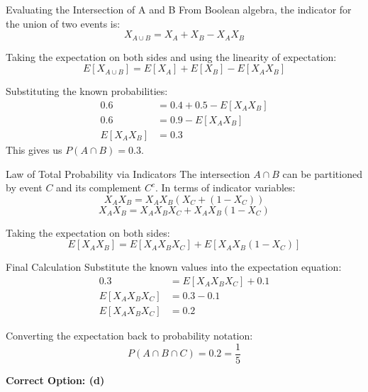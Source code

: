 \documentclass{beamer}
\begin{document}
\begin{frame}{Evaluating the Intersection of A and B}
    From Boolean algebra, the indicator for the union of two events is:
    \begin{equation}
        X_{A \cup B} = X_A + X_B - X_A X_B
    \end{equation}
    
    Taking the expectation on both sides and using the linearity of expectation:
    \begin{equation}
        E[X_{A \cup B}] = E[X_A] + E[X_B] - E[X_A X_B]
    \end{equation}
    
    Substituting the known probabilities:
    \begin{align}
        0.6 &= 0.4 + 0.5 - E[X_A X_B] \\
        0.6 &= 0.9 - E[X_A X_B] \\
        E[X_A X_B] &= 0.3
    \end{align}
    This gives us $P(A \cap B) = 0.3$.
\end{frame}

\begin{frame}{Law of Total Probability via Indicators}
    The intersection $A \cap B$ can be partitioned by event $C$ and its complement $C^c$. In terms of indicator variables:
    \begin{equation}
        X_A X_B = X_A X_B (X_C + (1 - X_C))
    \end{equation}
    \begin{equation}
        X_A X_B = X_A X_B X_C + X_A X_B (1 - X_C)
    \end{equation}
    
    Taking the expectation on both sides:
    \begin{equation}
        E[X_A X_B] = E[X_A X_B X_C] + E[X_A X_B (1 - X_C)]
    \end{equation}
\end{frame}

\begin{frame}{Final Calculation}
    Substitute the known values into the expectation equation:
    \begin{align}
        0.3 &= E[X_A X_B X_C] + 0.1 \\
        E[X_A X_B X_C] &= 0.3 - 0.1 \\
        E[X_A X_B X_C] &= 0.2
    \end{align}
    
    Converting the expectation back to probability notation:
    \begin{equation}
        P(A \cap B \cap C) = 0.2 = \frac{1}{5}
    \end{equation}
    
    \vspace{0.5cm}
    \textbf{Correct Option: (d)}
\end{frame}
\end{document}
